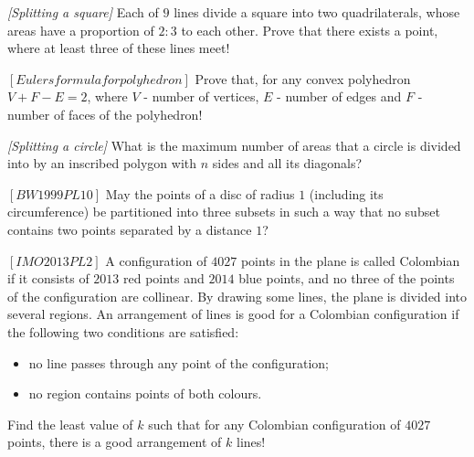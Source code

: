 

%


\noindent 

\begin{problem}
\textit{[Splitting a square]}
Each of $9$ lines divide a square into two quadrilaterals, whose areas have a proportion of $2:3$ to each other. Prove that there exists a point, where at least three of these lines meet!
\end{problem}
%

\begin{problem}
$[Eulers formula for polyhedron]$
Prove that, for any convex polyhedron $V+F-E=2$, where $V$ - number of vertices, $E$ - number of edges and $F$ - number of faces of the polyhedron!
\end{problem}

\begin{problem}
\textit{[Splitting a circle]}
What is the maximum number of areas that a circle is divided into by an inscribed polygon with $n$ sides and all its diagonals?
\end{problem}




\begin{problem}
$[BW1999PL10]$
May the points of a disc of radius $1$ (including its circumference) be partitioned into three subsets in such a way that no subset contains two points separated by a distance $1$?
\end{problem}

\begin{problem}
$[IMO2013PL2]$
A configuration of $4027$ points in the plane is called Colombian if it consists of $2013$ red points and $2014$ blue points, and no three of the points of the configuration are collinear. By drawing some lines, the plane is divided into several regions. An arrangement of lines is good for a Colombian configuration if the following two conditions are satisfied:
\begin{itemize}
\item no line passes through any point of the configuration;
\item no region contains points of both colours.
\end{itemize}
Find the least value of $k$ such that for any Colombian configuration of $4027$ points, there is a good arrangement of $k$ lines!

\end{problem}

